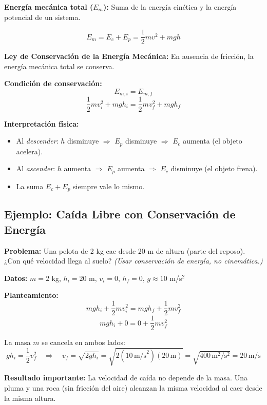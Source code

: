 \begin{seccion}
\begin{definicion}
    \textbf{Energía mecánica total ($E_m$):} Suma de la energía cinética y la energía potencial de un sistema.
\end{definicion}

\begin{ecuacion}
$$E_m = E_c + E_p = \frac{1}{2}mv^2 + mgh$$
\end{ecuacion}

\begin{definicion}
    \textbf{Ley de Conservación de la Energía Mecánica:} En ausencia de fricción, la energía mecánica total se conserva.
\end{definicion}

\begin{ecuacion}
\textbf{Condición de conservación:}
$$E_{m,i} = E_{m,f}$$
$$\frac{1}{2}mv_i^2 + mgh_i = \frac{1}{2}mv_f^2 + mgh_f$$
\end{ecuacion}

\textbf{Interpretación física:}
\begin{itemize}
    \item Al \textit{descender}: $h$ disminuye $\Rightarrow$ $E_p$ disminuye $\Rightarrow$ $E_c$ aumenta (el objeto acelera).
    \item Al \textit{ascender}: $h$ aumenta $\Rightarrow$ $E_p$ aumenta $\Rightarrow$ $E_c$ disminuye (el objeto frena).
    \item La suma $E_c + E_p$ siempre vale lo mismo.
\end{itemize}
\end{seccion}

\subsection{Ejemplo: Caída Libre con Conservación de Energía}

\begin{seccion}
\textbf{Problema:} Una pelota de 2 kg cae desde 20 m de altura (parte del reposo). ¿Con qué velocidad llega al suelo? \textit{(Usar conservación de energía, no cinemática.)}

\textbf{Datos:} $m = 2$ kg, $h_i = 20$ m, $v_i = 0$, $h_f = 0$, $g \approx 10$ m/s$^2$

\textbf{Planteamiento:}
$$mgh_i + \frac{1}{2}mv_i^2 = mgh_f + \frac{1}{2}mv_f^2$$
$$mgh_i + 0 = 0 + \frac{1}{2}mv_f^2$$

La masa $m$ se cancela en ambos lados:
$$gh_i = \frac{1}{2}v_f^2 \quad \Rightarrow \quad v_f = \sqrt{2gh_i} = \sqrt{2(10\,\text{m/s}^2)(20\,\text{m})} = \sqrt{400\,\text{m}^2/\text{s}^2} = 20\,\text{m/s}$$

\begin{nota}
    \textbf{Resultado importante:} La velocidad de caída no depende de la masa. Una pluma y una roca (sin fricción del aire) alcanzan la misma velocidad al caer desde la misma altura.
\end{nota}
\end{seccion}

